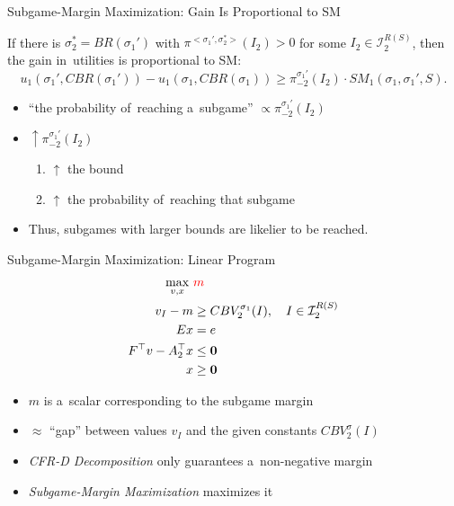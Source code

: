 \documentclass{beamer}
\theoremstyle{definition}
\newcommand{\vect}[1]{\boldsymbol{#1}}
\newcommand{\I}{\mathcal{I}}
\begin{document}
  \begin{frame}{Subgame-Margin Maximization: Gain Is Proportional to SM}
    \pause
    \begin{framed}
      \begin{theorem}
        If there is $\sigma_2^* = BR(\sigma_1')$ with $\pi^{<\sigma_1',\sigma_2^*>} (I_2) > 0$ for some $I_2 \in\I_2^{R(S)}$, then the gain in~utilities is proportional to SM:
        \[
          u_1(\sigma_1', CBR(\sigma_1')) - u_1(\sigma_1, CBR(\sigma_1)) \ge \pi_{-2}^{\sigma_1'} (I_2) \cdot SM_1(\sigma_1, \sigma_1', S).
        \]
      \end{theorem}
    \end{framed}
    \pause

    \begin{itemize}[<+- | alert@+>]
       \item ``the probability of~reaching a~subgame'' $\propto \pi_{-2}^{\sigma_1'}(I_2)$
       \item $\uparrow \pi_{-2}^{\sigma_1'}(I_2)$
         \begin{enumerate}[$\Rightarrow$]
           \item $\uparrow$ the bound
           \item $\uparrow$ the probability of~reaching that subgame
         \end{enumerate}
       \item Thus, subgames with larger bounds are likelier to be reached.
    \end{itemize}
  \end{frame}

  \begin{frame}{Subgame-Margin Maximization: Linear Program}
    \begin{equation*}
      \label{lp:max-margin}
      \begin{split}
        \max_{v, x}\ &\textcolor{red}{m} \\
        v_I - m &\ge CBV_2^{\sigma_1}(I), \quad I \in \I_2^{R(S)}\\ 
        Ex &= e \\
        F^\top v - A_2^\top x &\le \vect{0} \\
        x &\ge \vect{0}
      \end{split}
    \end{equation*}
    \pause

    \begin{itemize}[<+- | alert@+>]
      \item $m$ is a~scalar corresponding to the subgame margin
      \item $\approx$ ``gap'' between values $v_I$ and the given constants $CBV_2^\sigma(I)$
      \item \emph{CFR-D Decomposition} only guarantees a~non-negative margin
      \item \emph{Subgame-Margin Maximization} maximizes it
    \end{itemize}
  \end{frame}
\end{document}
